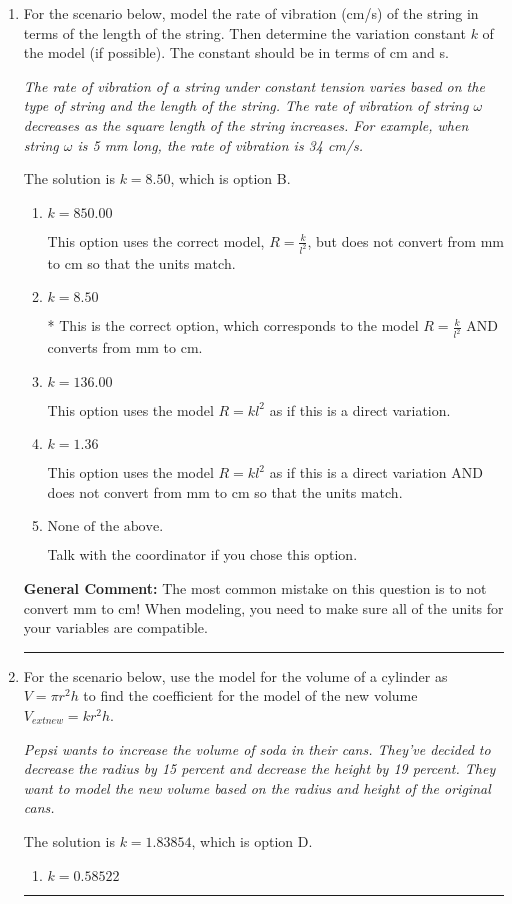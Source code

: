 \documentclass{extbook}[14pt]
\newcommand{\litem}[1]{\item #1

\rule{\textwidth}{0.4pt}}
\begin{document}
\begin{enumerate}\litem{
For the scenario below, model the rate of vibration (cm/s) of the string in terms of the length of the string. Then determine the variation constant $k$ of the model (if possible). The constant should be in terms of cm and s.

\begin{center}
    \textit{ The rate of vibration of a string under constant tension varies based on the type of string and the length of the string. The rate of vibration of string $\omega$ decreases as the square length of the string increases. For example, when string $\omega$ is 5 mm long, the rate of vibration is 34 cm/s. }
\end{center}
The solution is \( k = 8.50 \), which is option B.\begin{enumerate}[label=\Alph*.]
\item \( k = 850.00 \)

This option uses the correct model, $R = \frac{k}{l^{2}}$, but does not convert from mm to cm so that the units match.
\item \( k = 8.50 \)

* This is the correct option, which corresponds to the model $R = \frac{k}{l^{2}}$ AND converts from mm to cm.
\item \( k = 136.00 \)

This option uses the model $R = kl^{2}$ as if this is a direct variation.
\item \( k = 1.36 \)

This option uses the model $R = kl^{2}$ as if this is a direct variation AND does not convert from mm to cm so that the units match.
\item \( \text{None of the above.} \)

Talk with the coordinator if you chose this option.
\end{enumerate}

\textbf{General Comment:} The most common mistake on this question is to not convert mm to cm! When modeling, you need to make sure all of the units for your variables are compatible.
}
\litem{
For the scenario below, use the model for the volume of a cylinder as $V = \pi r^2 h$ to find the coefficient for the model of the new volume $V_{	ext{new}} = k r^2 h$.

\begin{center}
    \textit{ Pepsi wants to increase the volume of soda in their cans. They've decided to decrease the radius by 15 percent and decrease the height by 19 percent. They want to model the new volume based on the radius and height of the original cans. }
\end{center}
The solution is \( k = 1.83854 \), which is option D.\begin{enumerate}[label=\Alph*.]
\item \( k = 0.58522 \)


\end{enumerate}}
\end{enumerate}
\end{document}
